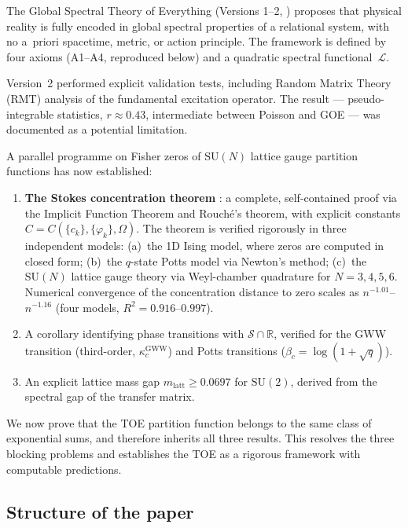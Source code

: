 \documentclass[12pt]{article}
\theoremstyle{definition}
\theoremstyle{remark}
\newcommand{\SU}{\mathrm{SU}}
\begin{document}
The Global Spectral Theory of Everything (Versions 1--2,
\cite{Olbryk2026v1,Olbryk2026v2}) proposes that physical reality
is fully encoded in global spectral properties of a relational system,
with no a~priori spacetime, metric, or action principle.
The framework is defined by four axioms (A1--A4, reproduced below)
and a quadratic spectral functional~$\mathcal{L}$.

Version~2 performed explicit validation tests, including Random Matrix
Theory (RMT) analysis of the fundamental excitation operator.  The
result --- pseudo-integrable statistics, $r\approx 0.43$, intermediate
between Poisson and GOE --- was documented as a potential limitation.

A parallel programme \cite{OlbrykPsi2026} on Fisher zeros of
$\SU(N)$ lattice gauge partition functions has now established:
\begin{enumerate}
\item \textbf{The Stokes concentration theorem} \cite[Thm.~1]{OlbrykPsi2026}: a
  complete, self-contained proof via the Implicit Function Theorem and
  Rouch\'e's theorem, with explicit constants $C = C(\{c_k\},\{\varphi_k\},\Omega)$.
  The theorem is verified rigorously in three independent models:
  (a)~the 1D Ising model, where zeros are computed in closed form;
  (b)~the $q$-state Potts model via Newton's method;
  (c)~the $\SU(N)$ lattice gauge theory via Weyl-chamber quadrature
  for $N=3,4,5,6$.  Numerical convergence of the concentration distance
  to zero scales as $n^{-1.01}$--$n^{-1.16}$ (four models, $R^2=0.916$--$0.997$).
\item A corollary identifying phase transitions with
  $\mathcal{S} \cap \mathbb{R}$, verified for the GWW transition
  (third-order, $\kappa_c^{\mathrm{GWW}}$) and Potts transitions ($\beta_c = \log(1+\sqrt{q})$).
\item An explicit lattice mass gap $m_{\mathrm{latt}} \geq 0.0697$
  for $\SU(2)$, derived from the spectral gap of the transfer matrix.
\end{enumerate}

We now prove that the TOE partition function belongs to the same class
of exponential sums, and therefore inherits all three results.
This resolves the three blocking problems and establishes the TOE
as a rigorous framework with computable predictions.

\subsection*{Structure of the paper}
\end{document}
